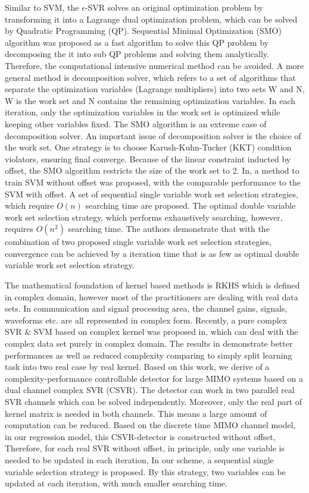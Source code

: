 \documentclass[12pt, draftclsnofoot, onecolumn]{IEEEtran}
\begin{document}
\begin{spacing}{2}
Similar to SVM, the $\epsilon$-SVR solves an original optimization problem by transforming it into a Lagrange dual optimization problem, which can be solved by Quadratic Programming (QP). Sequential Minimal Optimization (SMO) algorithm was proposed as a fast algorithm to solve this QP problem by decomposing the it into sub QP problems and solving them analytically\cite{platt1999fast}. Therefore, the computational intensive numerical method can be avoided. A more general method is decomposition solver, which refers to a set of algorithms that separate the optimization variables (Lagrange multipliers) into two sets W and N, W is the work set and N contains the remaining optimization variables. In each iteration, only the optimization variables in the work set is optimized while keeping other variables fixed. The SMO algorithm is an extreme case of decomposition solver. An important issue of decomposition solver is the choice of the work set. One strategy is to choose Karush-Kuhn-Tucker (KKT) condition violators, ensuring final converge\cite{osuna1997improved}. Because of the linear constraint inducted by offset, the SMO algorithm restricts the size of the work set to 2. In\cite{steinwart2011training}, a method to train SVM without offset was proposed, with the comparable performance to the SVM with offset. A set of sequential single variable work set selection strategies, which require $O(n)$ searching time are proposed. The optimal double variable work set selection strategy, which performs exhaustively searching, however, requires $O(n^{2})$ searching time. The authors demonstrate that with the combination of two proposed single variable work set selection strategies, convergence can be achieved by a iteration time that is as few as optimal double variable work set selection strategy.

The mathematical foundation of kernel based methods is RKHS which is defined in complex domain, however most of the practitioners are dealing with real data sets. In communication and signal processing area, the channel gains, signals, waveforms etc. are all represented in complex form. Recently, a pure complex SVR \& SVM based on complex kernel was proposed in\cite{bouboulis2013complex}, which can deal with the complex data set purely in complex domain. The results in\cite{bouboulis2013complex} demonstrate better performances as well as reduced complexity comparing to simply split learning task into two real case by real kernel.  
Based on this work, we derive of a complexity-performance controllable detector for large MIMO systems based on a dual channel complex SVR (CSVR). The detector can work in two parallel real SVR channels which can be solved independently. Moreover, only the real part of kernel matrix is needed in both channels. This means a large amount of computation can be reduced.
Based on the discrete time MIMO channel model, in our regression model, this CSVR-detector
is constructed without offset, Therefore, for each real SVR without offset, in principle, only one variable is needed to be updated in each iteration, In our scheme, a sequential single variable selection strategy is proposed. By this strategy, two variables can be updated at each iteration, with much smaller searching time.    
  

\end{spacing}
\end{document}
